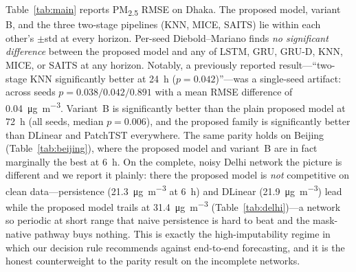 \documentclass[review,3p,times]{elsarticle}
\newcommand{\ugm}{\si{\micro\gram\per\cubic\metre}}
\newcommand{\pmf}{PM\textsubscript{2.5}}
\begin{document}
Table~\ref{tab:main} reports \pmf{} RMSE on Dhaka. The proposed model, variant B,
and the three two-stage pipelines (KNN, MICE, SAITS) lie within each other's
$\pm$std at every horizon. Per-seed Diebold--Mariano finds \emph{no significant
difference} between the proposed model and any of LSTM, GRU, GRU-D, KNN, MICE, or
SAITS at any horizon. Notably, a previously reported result---``two-stage KNN
significantly better at \SI{24}{\hour} ($p=0.042$)''---was a single-seed
artifact: across seeds $p = 0.038/0.042/0.891$ with a mean RMSE difference of
\SI{+0.04}{\ugm}. Variant~B is significantly better than the plain proposed model
at \SI{72}{\hour} (all seeds, median $p=0.006$), and the proposed family is
significantly better than DLinear and PatchTST everywhere. The same parity holds
on Beijing (Table~\ref{tab:beijing}), where the proposed model and variant~B are
in fact marginally the best at \SI{6}{\hour}. On the complete, noisy Delhi
network the picture is different and we report it plainly: there the proposed
model is \emph{not} competitive on clean data---persistence
(\SI{21.3}{\ugm} at \SI{6}{\hour}) and DLinear (\SI{21.9}{\ugm}) lead while the
proposed model trails at \SI{31.4}{\ugm} (Table~\ref{tab:delhi})---a network so
periodic at short range that naive persistence is hard to beat and the
mask-native pathway buys nothing. This is exactly the high-imputability regime in
which our decision rule recommends against end-to-end forecasting, and it is the
honest counterweight to the parity result on the incomplete networks.
\end{document}
